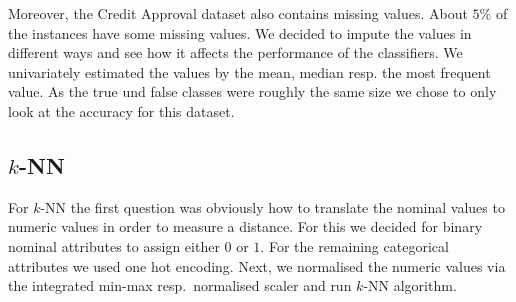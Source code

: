 \documentclass[a4paper,11pt]{article}
\begin{document}
    Moreover, the Credit Approval dataset also contains missing values. About $5\%$ of the instances have some missing values. We decided to impute the values in different ways and see how it affects the performance of the classifiers. We univariately estimated the values by the mean, median resp. the most frequent value. As the true und false classes were roughly the same size we chose to only look at the accuracy for this dataset.
    
    \subsection{$k$-NN}
        For $k$-NN the first question was obviously how to translate the nominal values to numeric values in order to measure a distance. For this we decided for binary nominal attributes to assign either $0$ or $1$. For the remaining categorical attributes we used one hot encoding. 
        Next, we normalised the numeric values via the integrated min-max resp.\ normalised scaler and run $k$-NN algorithm.
        
\end{document}
